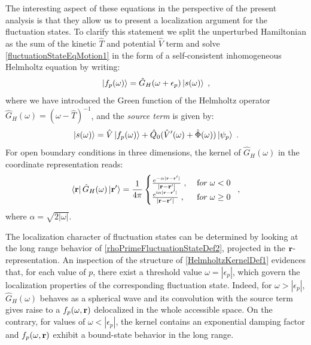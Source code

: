 \documentclass[reprint,aps,prb]{revtex4-1}
\renewcommand{\r}{{\bf r}}
\newcommand{\eps}{\epsilon}
\newcommand{\ii}{\mathrm{i}}
\newcommand{\be}{\begin{equation}}
\newcommand{\ee}{\end{equation}}
\newcommand{\nn}{\notag}
\newcommand{\lb}{\label}
\newcommand{\op}[1]{\hat {#1}}
\begin{document}
The interesting aspect of these equations in the perspective of the present analysis is that they allow us to present a localization argument for the fluctuation 
states. To clarify this statement we split the unperturbed Hamiltonian as the sum of the kinetic $\op T$ and potential $\op V$ term and solve \eqref{fluctuationStateEqMotion1} in the form 
of a self-consistent inhomogeneous Helmholtz equation by writing:
\be\lb{rhoPrimeFluctuationStateDef2}
\ket{f_p(\omega)} = \op G_H(\omega+\epsilon_p)\ket{s(\omega)} \;,
\ee
where we have introduced the Green function of the Helmholtz operator $\op G_H(\omega) = (\omega-\op T)^{-1}$,
and the \emph{source term} is given by:
\be
\ket{s(\omega)} =  \op V\ket{f_p(\omega)} + \op Q_0(\op V'(\omega) + \op \Phi(\omega))\ket{\psi_p} \;.\nn
\ee
For open boundary conditions in three dimensions, the kernel of $\op G_H(\omega)$ in the coordinate representation reads: 
\be\lb{HelmholtzKernelDef1}
\bra{\r} \op G_H(\omega) \ket{\r'} = \frac{1}{4\pi} \begin{cases}
\frac{e^{-\alpha|\r - \r' |}}{|\r- \r' |} \;,\; & {\textrm for}\; \omega  < 0\; \\ 
\frac{e^{\ii \alpha |\r-\r' |}}{|\r-\r' |} \;, & {\textrm for} \; \omega \geq 0
\end{cases} \;,
\ee
where $\alpha = \sqrt{2|\omega|}$. 

The localization character of fluctuation states can be determined by looking at the long range behavior of \eqref{rhoPrimeFluctuationStateDef2}, projected in the $\r$-representation.
An inspection of the structure of \eqref{HelmholtzKernelDef1} evidences that, for each value of $p$, there exist a threshold value $\omega = |\eps_p|$, which govern the localization 
properties of the corresponding fluctuation state. Indeed, for $\omega > |\eps_p|$,  $\op G_H(\omega)$ behaves as a spherical wave and its convolution with the source term  gives 
raise to a $f_p(\omega,\r)$ delocalized in the whole accessible space. On the contrary, for values of $\omega < |\eps_p|$, %
the kernel contains an exponential damping factor and $f_p(\omega,\r)$ exhibit a bound-state behavior in the long range.   

\end{document}
